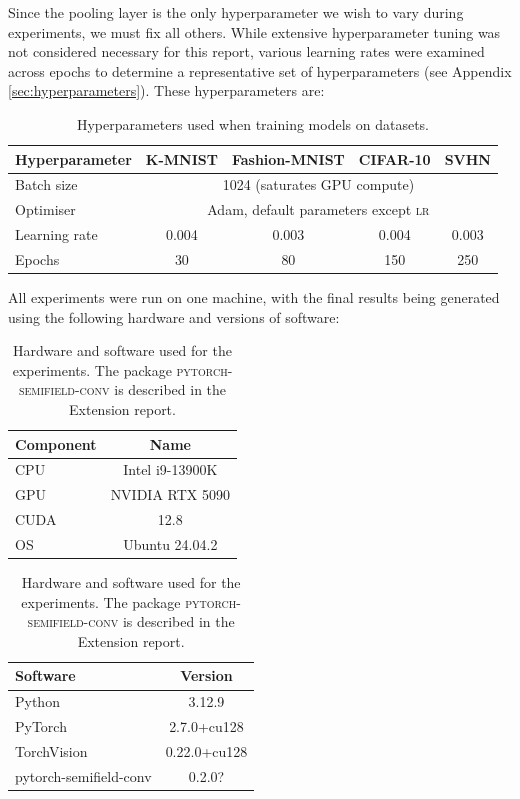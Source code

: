 \documentclass[a4paper, 12pt]{report}
\def\comment#1{\color{red}#1\color{black}}
\begin{document}
Since the pooling layer is the only hyperparameter we wish to vary during experiments, we must fix all others. While extensive hyperparameter tuning was not considered necessary for this report, various learning rates were examined across epochs to determine a representative set of hyperparameters (see Appendix \ref{sec:hyperparameters}). These hyperparameters are:

\begin{table}[!htbp]
\centering
\begin{tabular}{l|*4c}
\toprule
Hyperparameter & K-MNIST & Fashion-MNIST & CIFAR-10 & SVHN\\
\midrule
Batch size & \multicolumn{4}{c}{1024 (saturates GPU compute)}\\
Optimiser   &  \multicolumn{4}{c}{Adam, default parameters except \textsc{lr}} \\
Learning rate & 0.004 & 0.003 & 0.004 & 0.003 \\
Epochs & 30 & 80 & 150 & 250 \\
\bottomrule
\end{tabular}
\caption{Hyperparameters used when training models on datasets.}
\end{table}
\noindent
All experiments were run on one machine, with the final results being generated using the following hardware and versions of software:

\begin{table}[!htbp]
\centering
\begin{tabular}{l|c}
\toprule
Component & Name \\
\midrule
CPU & Intel i9-13900K \\
GPU & NVIDIA RTX 5090 \\
CUDA & 12.8\\
OS & Ubuntu 24.04.2\\
\bottomrule
\end{tabular}
\quad
\begin{tabular}{l|c}
\toprule
Software & Version \\
\midrule
Python & 3.12.9 \\
PyTorch & 2.7.0+cu128 \\
TorchVision & 0.22.0+cu128 \\
\small pytorch-semifield-conv & \comment{0.2.0?} \\
\bottomrule
\end{tabular}

\caption{Hardware and software used for the experiments. The package \textsc{pytorch-semifield-conv} is described in the Extension report.}
\vspace{-0.3cm}
\end{table}
\end{document}
